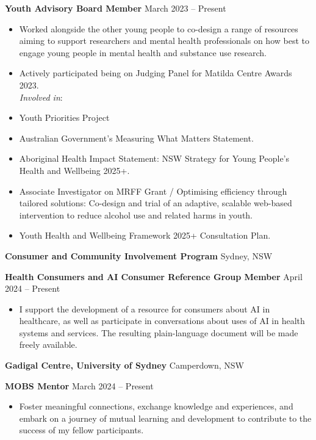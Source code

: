 \documentclass[11pt]{article}
\begin{document}
\textbf{Youth Advisory Board Member} \hfill March 2023 – Present
\begin{itemize}[noitemsep, topsep=0pt, partopsep=0pt, parsep=0pt]
    \item Worked alongside the other young people to co-design a range of resources aiming to support researchers and mental health professionals on how best to engage young people in mental health and substance use research.
    \item Actively participated being on Judging Panel for Matilda Centre Awards 2023.\\
    \textit{Involved in}:
    \item Youth Priorities Project
    \item Australian Government's Measuring What Matters Statement.
    \item Aboriginal Health Impact Statement: NSW Strategy for Young People's Health and Wellbeing 2025+.
    \item Associate Investigator on MRFF Grant / Optimising efficiency through tailored solutions: Co-design and trial of an adaptive, scalable web-based intervention to reduce alcohol use and related harms in youth.
    \item Youth Health and Wellbeing Framework 2025+ Consultation Plan.
\end{itemize}

\vspace{12pt}

\textbf{Consumer and Community Involvement Program} \hfill Sydney, NSW

\textbf{Health Consumers and AI Consumer Reference Group Member} \hfill April 2024 – Present
\begin{itemize}[noitemsep, topsep=0pt, partopsep=0pt, parsep=0pt]
    \item I support the development of a resource for consumers about AI in healthcare, as well as participate in conversations about uses of AI in health systems and services. The resulting plain-language document will be made freely available.
\end{itemize}

\vspace{12pt}

\textbf{Gadigal Centre, University of Sydney} \hfill Camperdown, NSW

\textbf{MOBS Mentor} \hfill March 2024 – Present
\begin{itemize}[noitemsep, topsep=0pt, partopsep=0pt, parsep=0pt]
    \item Foster meaningful connections, exchange knowledge and experiences, and embark on a journey of mutual learning and development to contribute to the success of my fellow participants. 
\end{itemize}
\end{document}
